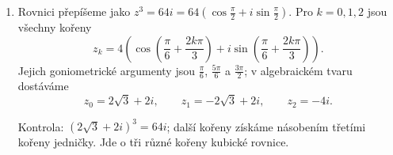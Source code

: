 \documentclass[a4paper,10pt]{article}
\begin{document}
\begin{enumerate}
\newpage
\item Rovnici přepíšeme jako $z^3=64i
=64(\cos\frac\pi2+i\sin\frac\pi2)$.
Pro $k=0,1,2$ jsou všechny kořeny
\[
z_k=4\left(\cos\left(\frac\pi6+\frac{2k\pi}3\right)
+i\sin\left(\frac\pi6+\frac{2k\pi}3\right)\right).
\]
Jejich goniometrické argumenty jsou $\frac\pi6$, $\frac{5\pi}6$
a $\frac{3\pi}2$; v algebraickém tvaru dostáváme
\[
z_0=2\sqrt3+2i,\qquad z_1=-2\sqrt3+2i,\qquad z_2=-4i.
\]
\begin{center}
\end{center}
Kontrola: $(2\sqrt3+2i)^3=64i$;
další kořeny získáme násobením třetími kořeny jedničky.
Jde o tři různé kořeny kubické rovnice.
\end{enumerate}

\newpage
\end{document}
